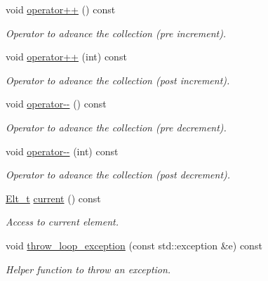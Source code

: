 \begin{DoxyCompactItemize}
void \hyperlink{class_d_d4hep_1_1_x_m_l_1_1_collection__t_afba24ece49cd00ba1ba295114c5b0d0a}{operator++} () const 
\begin{DoxyCompactList}\small\item\em Operator to advance the collection (pre increment). \item\end{DoxyCompactList}\item 
void \hyperlink{class_d_d4hep_1_1_x_m_l_1_1_collection__t_ab802a42886a5241fc465a1660d628d5a}{operator++} (int) const 
\begin{DoxyCompactList}\small\item\em Operator to advance the collection (post increment). \item\end{DoxyCompactList}\item 
void \hyperlink{class_d_d4hep_1_1_x_m_l_1_1_collection__t_a9926d533d43a6f2d10f6935759207b1f}{operator-\/-\/} () const 
\begin{DoxyCompactList}\small\item\em Operator to advance the collection (pre decrement). \item\end{DoxyCompactList}\item 
void \hyperlink{class_d_d4hep_1_1_x_m_l_1_1_collection__t_a7a5be60ec38895f011cee2c3feb038c4}{operator-\/-\/} (int) const 
\begin{DoxyCompactList}\small\item\em Operator to advance the collection (post decrement). \item\end{DoxyCompactList}\item 
\hyperlink{class_d_d4hep_1_1_x_m_l_1_1_handle__t_a81a72155f29971b37652430a334a6b30}{Elt\_\-t} \hyperlink{class_d_d4hep_1_1_x_m_l_1_1_collection__t_aedddc0c0d00f40248bbfe5a499fc532f}{current} () const 
\begin{DoxyCompactList}\small\item\em Access to current element. \item\end{DoxyCompactList}\item 
void \hyperlink{class_d_d4hep_1_1_x_m_l_1_1_collection__t_a6a4f5e072d0dc1dbdd5d2ae2c863be60}{throw\_\-loop\_\-exception} (const std::exception \&e) const 
\begin{DoxyCompactList}\small\item\em Helper function to throw an exception. \item\end{DoxyCompactList}\item 

\end{DoxyCompactItemize}
